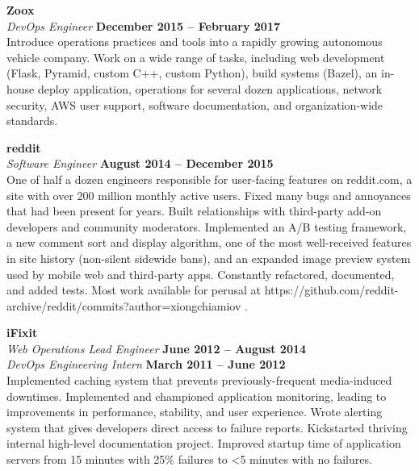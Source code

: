 \documentclass[margin,line]{resume}
\begin{document}
\begin{resume}
    \textbf{\listing Zoox} \vspace{2mm}\\\vspace{1mm}%
    \textsl{DevOps Engineer} \hfill \textbf{December 2015 -- February 2017}\\
    Introduce operations practices and tools into a rapidly growing autonomous vehicle company.
    Work on a wide range of tasks, including web development (Flask, Pyramid, custom C++, custom Python), build systems (Bazel), an in-house deploy application, operations for several dozen applications, network security, AWS user support, software documentation, and organization-wide standards.

    \textbf{\listing reddit} \vspace{2mm}\\\vspace{1mm}%
    \textsl{Software Engineer} \hfill \textbf{August 2014 -- December 2015}\\
    One of half a dozen engineers responsible for user-facing features on reddit.com, a site with over 200 million monthly active users.
    Fixed many bugs and annoyances that had been present for years.
    Built relationships with third-party add-on developers and community moderators.
    Implemented an A/B testing framework, a new comment sort and display algorithm, one of the most well-received features in site history (non-silent sidewide bans), and an expanded image preview system used by mobile web and third-party apps.
    Constantly refactored, documented, and added tests.
    Most work available for perusal at https://github.com/reddit-archive/reddit/commits?author=xiongchiamiov .

    \textbf{\listing iFixit} \vspace{2mm}\\\vspace{1mm}%
    \textsl{Web Operations Lead Engineer} \hfill \textbf{June 2012 -- August 2014}\\
    \textsl{DevOps Engineering Intern} \hfill \textbf{March 2011 -- June 2012}\\
    Implemented caching system that prevents previously-frequent media-induced downtimes.
    Implemented and championed application monitoring, leading to improvements in performance, stability, and user experience.
    Wrote alerting system that gives developers direct access to failure reports.
    Kickstarted thriving internal high-level documentation project.
    Improved startup time of application servers from 15 minutes with 25\% failures to \textless5 minutes with no failures.


\end{resume}
\end{document}
